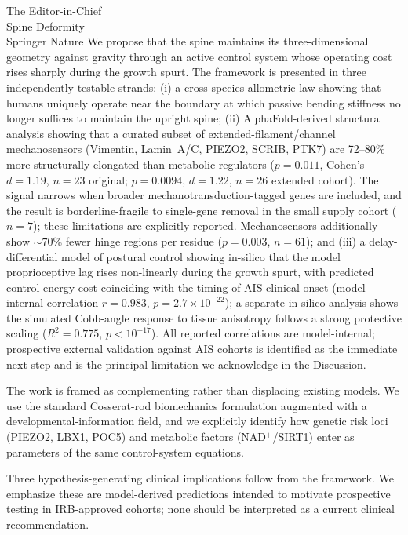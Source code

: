 \documentclass[12pt]{letter}
\begin{document}
\begin{letter}{The Editor-in-Chief\\Spine Deformity\\Springer Nature}
We propose that the spine maintains its three-dimensional geometry against gravity through an active control system whose operating cost rises sharply during the growth spurt. The framework is presented in three independently-testable strands: (i) a cross-species allometric law showing that humans uniquely operate near the boundary at which passive bending stiffness no longer suffices to maintain the upright spine; (ii) AlphaFold-derived structural analysis showing that a curated subset of extended-filament/channel mechanosensors (Vimentin, Lamin~A/C, PIEZO2, SCRIB, PTK7) are 72--80\% more structurally elongated than metabolic regulators ($p = 0.011$, Cohen's $d = 1.19$, $n = 23$ original; $p = 0.0094$, $d = 1.22$, $n = 26$ extended cohort). The signal narrows when broader mechanotransduction-tagged genes are included, and the result is borderline-fragile to single-gene removal in the small supply cohort ($n = 7$); these limitations are explicitly reported. Mechanosensors additionally show $\sim 70$\% fewer hinge regions per residue ($p = 0.003$, $n = 61$); and (iii) a delay-differential model of postural control showing in-silico that the model proprioceptive lag rises non-linearly during the growth spurt, with predicted control-energy cost coinciding with the timing of AIS clinical onset (model-internal correlation $r = 0.983$, $p = 2.7 \times 10^{-22}$); a separate in-silico analysis shows the simulated Cobb-angle response to tissue anisotropy follows a strong protective scaling ($R^2 = 0.775$, $p < 10^{-17}$). All reported correlations are model-internal; prospective external validation against AIS cohorts is identified as the immediate next step and is the principal limitation we acknowledge in the Discussion.

The work is framed as complementing rather than displacing existing models. We use the standard Cosserat-rod biomechanics formulation augmented with a developmental-information field, and we explicitly identify how genetic risk loci (PIEZO2, LBX1, POC5) and metabolic factors (NAD$^+$/SIRT1) enter as parameters of the same control-system equations.

Three hypothesis-generating clinical implications follow from the framework. We emphasize these are model-derived predictions intended to motivate prospective testing in IRB-approved cohorts; none should be interpreted as a current clinical recommendation.


\end{letter}
\end{document}
